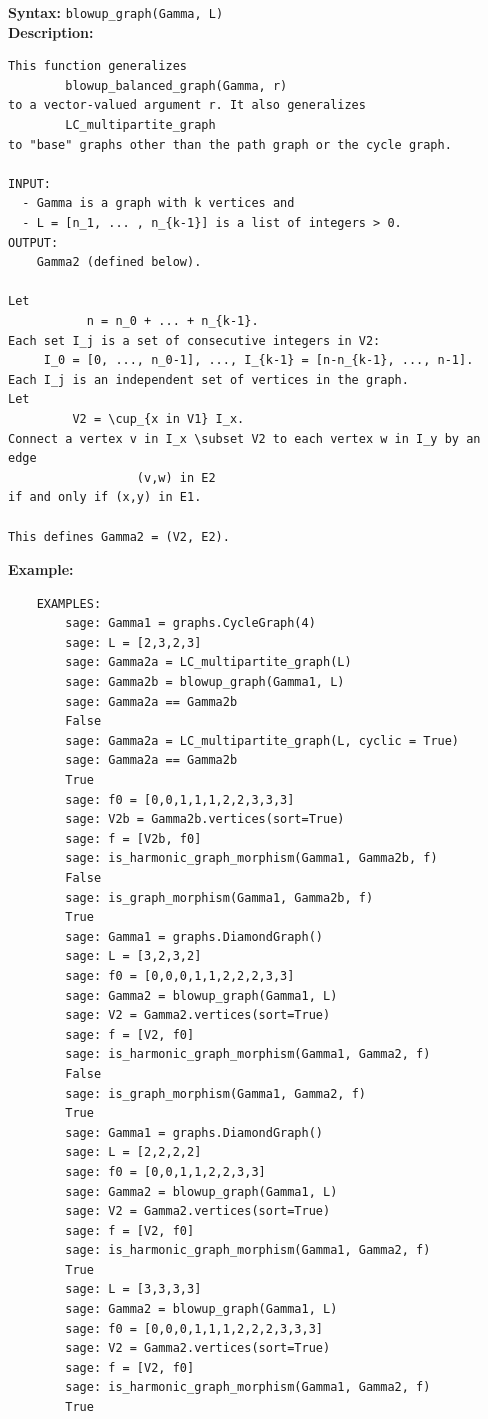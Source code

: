 \documentclass{article}
\begin{document}
\textbf{Syntax:} \verb}blowup_graph(Gamma, L)}\\

\textbf{Description:}
\begin{verbatim}
This function generalizes
        blowup_balanced_graph(Gamma, r)
to a vector-valued argument r. It also generalizes
        LC_multipartite_graph
to "base" graphs other than the path graph or the cycle graph.
 
INPUT:
  - Gamma is a graph with k vertices and 
  - L = [n_1, ... , n_{k-1}] is a list of integers > 0. 
OUTPUT:
    Gamma2 (defined below).

Let
           n = n_0 + ... + n_{k-1}.
Each set I_j is a set of consecutive integers in V2:
     I_0 = [0, ..., n_0-1], ..., I_{k-1} = [n-n_{k-1}, ..., n-1].
Each I_j is an independent set of vertices in the graph.
Let
         V2 = \cup_{x in V1} I_x.
Connect a vertex v in I_x \subset V2 to each vertex w in I_y by an
edge
                  (v,w) in E2
if and only if (x,y) in E1.

This defines Gamma2 = (V2, E2).
\end{verbatim}

\textbf{Example:}
\begin{verbatim}
    EXAMPLES:
        sage: Gamma1 = graphs.CycleGraph(4)      
        sage: L = [2,3,2,3]                         
        sage: Gamma2a = LC_multipartite_graph(L)    
        sage: Gamma2b = blowup_graph(Gamma1, L)              
        sage: Gamma2a == Gamma2b         
        False
        sage: Gamma2a = LC_multipartite_graph(L, cyclic = True)
        sage: Gamma2a == Gamma2b 
        True
        sage: f0 = [0,0,1,1,1,2,2,3,3,3]   
        sage: V2b = Gamma2b.vertices(sort=True)         
        sage: f = [V2b, f0] 
        sage: is_harmonic_graph_morphism(Gamma1, Gamma2b, f) 
        False
        sage: is_graph_morphism(Gamma1, Gamma2b, f)  
        True
        sage: Gamma1 = graphs.DiamondGraph()      
        sage: L = [3,2,3,2]     
        sage: f0 = [0,0,0,1,1,2,2,2,3,3] 
        sage: Gamma2 = blowup_graph(Gamma1, L)                                   
        sage: V2 = Gamma2.vertices(sort=True) 
        sage: f = [V2, f0]    
        sage: is_harmonic_graph_morphism(Gamma1, Gamma2, f) 
        False
        sage: is_graph_morphism(Gamma1, Gamma2, f)  
        True
        sage: Gamma1 = graphs.DiamondGraph() 
        sage: L = [2,2,2,2]      
        sage: f0 = [0,0,1,1,2,2,3,3]   
        sage: Gamma2 = blowup_graph(Gamma1, L)                                   
        sage: V2 = Gamma2.vertices(sort=True)    
        sage: f = [V2, f0]   
        sage: is_harmonic_graph_morphism(Gamma1, Gamma2, f) 
        True
        sage: L = [3,3,3,3]   
        sage: Gamma2 = blowup_graph(Gamma1, L)                                   
        sage: f0 = [0,0,0,1,1,1,2,2,2,3,3,3] 
        sage: V2 = Gamma2.vertices(sort=True) 
        sage: f = [V2, f0]  
        sage: is_harmonic_graph_morphism(Gamma1, Gamma2, f) 
        True
\end{verbatim}
\end{document}
